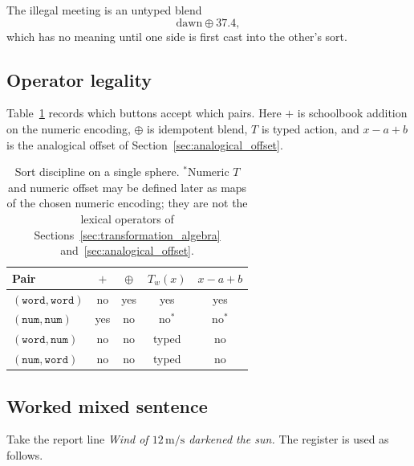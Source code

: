 \documentclass[12pt, a4paper]{article}
\begin{document}
The illegal meeting is an untyped blend
\begin{equation}
    \mathrm{dawn} \oplus 37.4,
\end{equation}
which has no meaning until one side is first cast into the other's
sort.

\subsection{Operator legality}
\label{subsec:type_table}
Table~\ref{tab:type_table} records which buttons accept which pairs.
Here $+$ is schoolbook addition on the numeric encoding, $\oplus$ is
idempotent blend, $T$ is typed action, and $x-a+b$ is the analogical
offset of Section~\ref{sec:analogical_offset}.

\begin{table}[h]
\centering
\begin{tabular}{lcccc}
\hline
Pair & $+$ & $\oplus$ & $T_w(x)$ & $x-a+b$ \\
\hline
$(\mathtt{word},\mathtt{word})$ & no & yes & yes & yes \\
$(\mathtt{num},\mathtt{num})$   & yes & no  & no$^{*}$ & no$^{*}$ \\
$(\mathtt{word},\mathtt{num})$  & no & no  & typed & no \\
$(\mathtt{num},\mathtt{word})$  & no & no  & typed & no \\
\hline
\end{tabular}
\caption{Sort discipline on a single sphere.
$^{*}$Numeric $T$ and numeric offset may be defined later as
maps of the chosen numeric encoding; they are not the lexical
operators of Sections~\ref{sec:transformation_algebra}
and~\ref{sec:analogical_offset}.}
\label{tab:type_table}
\end{table}

\subsection{Worked mixed sentence}
\label{subsec:mixed_sentence}
Take the report line \emph{Wind of $12\,\mathrm{m/s}$ darkened the sun.}
The register is used as follows.
\end{document}
